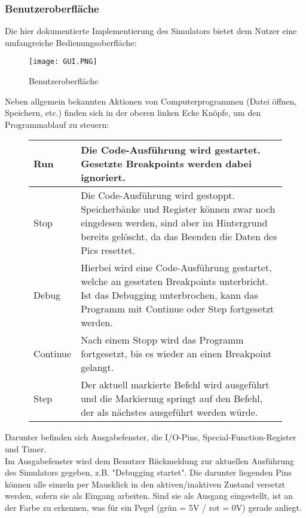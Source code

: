 \documentclass[
10pt, %
a4paper, %
oneside, %
headinclude,footinclude, %
BCOR5mm, %
]{scrartcl}
\begin{document}
	\subsubsection{Benutzeroberfläche}
	Die hier dokumentierte Implementierung des Simulators bietet dem Nutzer eine umfangreiche Bedienungsoberfläche:
	
	\begin{figure}[h]
		\begin{center}
			\texttt{[image: GUI.PNG]}
			\caption{Benutzeroberfläche}
		\end{center}
	\end{figure}
	
	Neben allgemein bekannten Aktionen von Computerprogrammen (Datei öffnen, Speichern, etc.) finden sich in der oberen linken Ecke Knöpfe, um den Programmablauf zu steuern:
	\begin{figure}[h]
		\begin{tabularx}{\textwidth}{X|X}
			Run			& Die Code-Ausführung wird gestartet. Gesetzte Breakpoints werden dabei ignoriert.		\\
			\hline
			Stop		& Die Code-Ausführung wird gestoppt. Speicherbänke und Register können zwar noch eingelesen werden, sind aber im Hintergrund bereits gelöscht, da das Beenden die Daten des Pics resettet.		\\
			\hline
			Debug		& Hierbei wird eine Code-Ausführung gestartet, welche an gesetzten Breakpoints unterbricht. Ist das Debugging unterbrochen, kann das Programm mit Continue oder Step fortgesetzt werden.		\\
			\hline
			Continue	& Nach einem Stopp wird das Programm fortgesetzt, bis es wieder an einen Breakpoint gelangt.		\\
			\hline
			Step		& Der aktuell markierte Befehl wird ausgeführt und die Markierung springt auf den Befehl, der als nächstes ausgeführt werden würde.		\\
		\end{tabularx}
	\end{figure}

	Darunter befinden sich Ausgabefenster, die I/O-Pins, Special-Function-Register und Timer.
	\\Im Ausgabefenster wird dem Benutzer Rückmeldung zur aktuellen Ausführung des Simulators gegeben, z.B. "Debugging startet". Die darunter liegenden Pins können alle einzeln per Mausklick in den aktiven/inaktiven Zustand versetzt werden, sofern sie als Eingang arbeiten. Sind sie als Ausgang eingestellt, ist an der Farbe zu erkennen, was für ein Pegel (grün = 5V / rot = 0V) gerade anliegt.
	
\end{document}
